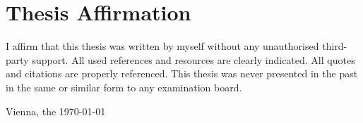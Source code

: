 \chapter*{Thesis Affirmation}

I affirm that this thesis was written by myself without any unauthorised
third-party support. All used references and resources are clearly
indicated. All quotes and citations are properly referenced. This thesis was
never presented in the past in the same or similar form to any examination
board. 

\vspace{1cm}

Vienna, the \today


